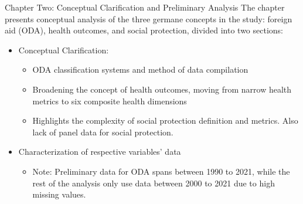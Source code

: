 \documentclass[aspectratio=169,handout, 10pt]{beamer}
\begin{document}
\begin{frame}{Chapter Two: Conceptual Clarification and Preliminary Analysis}
The chapter presents conceptual analysis of the three germane concepts in the study: foreign aid (ODA), health outcomes, and social protection, divided into two sections: 

\begin{itemize}
    \item Conceptual Clarification:
    \begin{itemize}
        \item ODA classification systems and method of data compilation
        \item Broadening the concept of health outcomes, moving from narrow health metrics to six composite health dimensions
        \item Highlights the complexity of social protection definition and metrics. Also lack of panel data for social protection. 
    \end{itemize}
    \item Characterization of respective variables' data
    \begin{itemize}
        \item Note: Preliminary data for ODA spans between 1990 to 2021, while the rest of the analysis only use data between 2000 to 2021 due to high missing values. 
    \end{itemize}
\end{itemize}
\end{frame}


\end{document}
